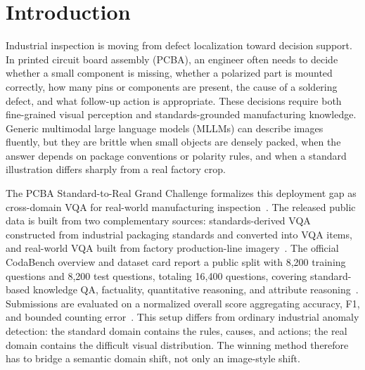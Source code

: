 \documentclass[sigconf, screen, review, anonymous]{acmart}
\begin{document}


\maketitle

\section{Introduction}
\label{sec:intro}

Industrial inspection is moving from defect localization toward decision support. In printed circuit board assembly (PCBA), an engineer often needs to decide whether a small component is missing, whether a polarized part is mounted correctly, how many pins or components are present, the cause of a soldering defect, and what follow-up action is appropriate. These decisions require both fine-grained visual perception and standards-grounded manufacturing knowledge. Generic multimodal large language models (MLLMs) can describe images fluently, but they are brittle when small objects are densely packed, when the answer depends on package conventions or polarity rules, and when a standard illustration differs sharply from a real factory crop.

The PCBA Standard-to-Real Grand Challenge formalizes this deployment gap as cross-domain VQA for real-world manufacturing inspection~\cite{pcba_challenge_website,pcba_challenge_eval}. The released public data is built from two complementary sources: standards-derived VQA constructed from industrial packaging standards and converted into VQA items, and real-world VQA built from factory production-line imagery~\cite{pcba_challenge_dataset}. The official CodaBench overview and dataset card report a public split with 8,200 training questions and 8,200 test questions, totaling 16,400 questions, covering standard-based knowledge QA, factuality, quantitative reasoning, and attribute reasoning~\cite{pcba_challenge_eval,pcba_challenge_dataset}. Submissions are evaluated on a normalized overall score aggregating accuracy, F1, and bounded counting error~\cite{pcba_challenge_eval}. This setup differs from ordinary industrial anomaly detection: the standard domain contains the rules, causes, and actions; the real domain contains the difficult visual distribution. The winning method therefore has to bridge a semantic domain shift, not only an image-style shift.
\end{document}
